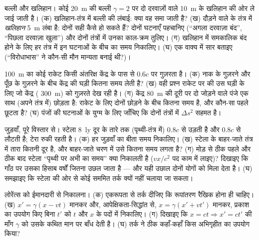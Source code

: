 \begin{exercise}[$\star\star$]\label{exo:b3:relativistic-kinematics:8}
बल्ली और खलिहान। कोई \qty{20}{m} की बल्ली $\gamma = 2$ पर दो दरवाज़ों
वाले \qty{10}{m} के खलिहान की ओर ले जाई जाती है। (क) खलिहान-तंत्र में
बल्ली की लंबाई: क्या वह समा जाती है? (ख) दौड़ने वाले के तंत्र में
\emph{खलिहान} \qty{5}{m} लंबा है: दोनों सही कैसे हो सकते हैं? दोनों
घटनाएँ पहचानिए (``अगला दरवाज़ा बंद'', ``पिछला दरवाज़ा खुला'') और दोनों
तंत्रों में उनका काल-क्रम तुलिए। (ग) खलिहान में समकालिक बंद होने के लिए
हर तंत्र में इन घटनाओं के बीच का समय निकालिए। (घ) एक वाक्य में सार
बताइए (``विरोधाभास'' ने कौन-सी मौन मान्यता बनाई थी?)।
\end{exercise}

\begin{exercise}[$\star\star$]\label{exo:b3:relativistic-kinematics:9}
\qty{100}{m}  का कोई राकेट किसी अंतरिक्ष केंद्र के पास से
$0.6c$ पर गुज़रता है। (क) नाक के गुज़रने और पूँछ के गुज़रने के बीच केंद्र
की घड़ी कितना समय लेती है? (ख) वही प्रश्न राकेट पर की उस घड़ी के लिए जो
केंद्र ( \qty{300}{m}) को गुज़रते देख रही है। (ग) केंद्र
\qty{80}{m} की दूरी पर दो जोड़ने वाले पंजे एक साथ (अपने तंत्र में)
छोड़ता है: राकेट के लिए दोनों छोड़ने के बीच कितना समय है, और कौन-सा
पहले छूटता है? (घ) पंजों की घटनाओं के युग्म के लिए जाँचिए कि दोनों
तंत्रों में $\Delta s^2$ सहमत है।
\end{exercise}

\begin{exercise}[$\star\star\star$]\label{exo:b3:relativistic-kinematics:10}
जुड़वाँ, पूरे विस्तार से। स्टेला \qty{8}{ly} दूर के तारे तक
(पृथ्वी-तंत्र में) $0.8c$ से उड़ती है और $0.8c$ से लौटती है; टेरा रुकी
रहती है। (क) हर जुड़वाँ का बीता समय निकालिए। (ख) स्टेला के बाहर-जाते
तंत्र में तारा कितनी दूर है, और बाहर-जाते चरण में उसे कितना समय लगता
है? (ग) मोड़ से ठीक पहले और ठीक बाद स्टेला ``पृथ्वी पर अभी का समय''
क्या निकालती है ($vx/c^2$ पद काम में लाइए)? दिखाइए कि गाँठ पर उसका
हिसाब वर्षों जितना उछल जाता है --- और यही उछाल दोनों योगों को मिला
देता है। (घ) समझाइए कि स्टेला की ओर से कोई सममित तर्क क्यों नहीं चलाया
जा सकता।
\end{exercise}

\begin{exercise}[$\star\star\star$]\label{exo:b3:relativistic-kinematics:11}
लोरेंत्स को ईमानदारी से निकालना। (क) एकरूपता से तर्क दीजिए कि
रूपांतरण रैखिक होना ही चाहिए। (ख) $x' = \gamma(x - vt)$ मानकर और,
आपेक्षिकता-सिद्धांत से, $x = \gamma(x' + vt')$ मानकर, प्रकाश का उपयोग
किए बिना $t'$ को $t$ और $x$ के पदों में निकालिए। (ग) दिखाइए कि
$x = ct \Rightarrow x' = ct'$ की माँग $\gamma$ को उसके कथित मान पर बाँध
देती है। (घ) तर्क ने ठीक कहाँ-कहाँ किस अभिगृहीत का उपयोग किया?
\end{exercise}

